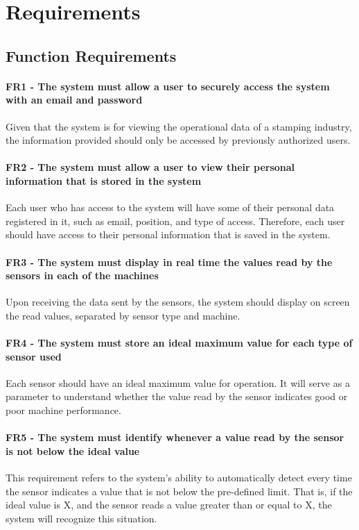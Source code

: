 \chapter{Requirements}\label{projectrequirements}
\section{Function Requirements}\label{functionrequirements}

\subsubsection{FR1 - The system must allow a user to securely access the system with an email and password}Given that the system is for viewing the operational data of a stamping industry, the information provided should only be accessed by previously authorized users.

\subsubsection{FR2 - The system must allow a user to view their personal information that is stored in the system}
Each user who has access to the system will have some of their personal data registered in it, such as email, position, and type of access. Therefore, each user should have access to their personal information that is saved in the system.

\subsubsection{FR3 - The system must display in real time the values read by the sensors in each of the machines}Upon receiving the data sent by the sensors, the system should display on screen the read values, separated by sensor type and machine.

\subsubsection{FR4 - The system must store an ideal maximum value for each type of sensor used}
Each sensor should have an ideal maximum value for operation. It will serve as a parameter to understand whether the value read by the sensor indicates good or poor machine performance.

\subsubsection{FR5 - The system must identify whenever a value read by the sensor is not below the ideal value}
This requirement refers to the system's ability to automatically detect every time the sensor indicates a value that is not below the pre-defined limit. That is, if the ideal value is X, and the sensor reads a value greater than or equal to X, the system will recognize this situation.

